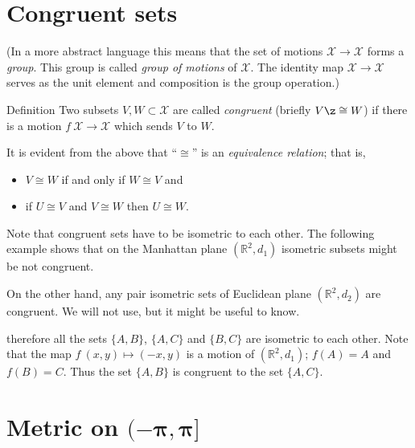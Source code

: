 {\section*{Congruent sets}



(In a more abstract language this means that  the set of motions $\mathcal X\to\mathcal X$ forms a {}\emph{group}.
This group is called \emph{group of motions} of $\mathcal X$.
The identity map $\mathcal X\to\mathcal X$ serves as the unit element  and composition is the group operation.)

\begin{thm}{Definition}
Two subsets $V,W\subset \mathcal X$ are called \emph{congruent} (briefly \index{$\cong$}$V\z\cong W$)
if there is a motion $f\:\mathcal X\to\mathcal X$ which sends $V$ to $W$.
\end{thm}

It is evident from the above that ``$\cong$'' is an  \emph{equivalence relation};
that is, 
\begin{itemize}
\item $V\cong W$ if and only if $W\cong V$ and 
\item if $U\cong V$ and $V\cong W$ then $U\cong W$.
\end{itemize}


Note that congruent sets have to be isometric to each other.
The following example shows that on the Manhattan plane $(\mathbb{R}^2,d_1)$ isometric subsets might be not congruent.

On the other hand,
any pair isometric sets of Euclidean plane $(\mathbb{R}^2,d_2)$ are congruent.
We will not use, but it might be useful to know.



therefore all the sets $\{A,B\}$, $\{A,C\}$ and $\{B,C\}$ are isometric to each other.
Note that the map $f\:(x,y)\mapsto (-x,y)$ is a motion of $(\mathbb{R}^2,d_1)$; 
$f(A)=A$ and $f(B)=C$.
Thus the set $\{A,B\}$ is congruent to the set $\{A,C\}$.









\section*{Metric on $\bm{(-\pi,\pi]}$}
\addtocontents{toc}{Metric on $(-\pi,\pi]$.}

}
